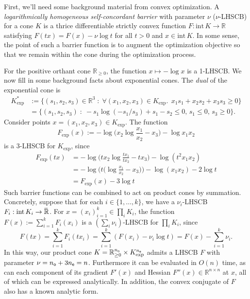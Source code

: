 \begin{subappendices}
\begin{lproof}
    First, we'll need some background material from convex optimization.
    A \emph{logarithmically homogeneous self-concordant barrier} with parameter $\nu$ ($\nu$-LHSCB) for a cone $K$ is a thrice differentiable strictly convex function $F: \mathrm{int}\, K \to \mathbb R$ satisfying
    $F(tx) = F(x) - \nu \log t$
    for all $t > 0$ and $x \in \mathrm{int}\, K$.
    In some sense, the point of such a barrier function is to augment the optimization objective so that we remain within the cone during the optimization process.


    For the positive orthant cone $\mathbb R_{\ge 0}$, the function
        $x \mapsto - \log x$ is a 1-LHSCB.
    We now fill in some background facts about exponential cones.
    The \emph{dual} of the exponential cone is
    \begin{align*}
        K_{\exp}^* &:= \big\{ (s_1, s_2, s_3) \in \mathbb R^3 \;:\;
            \forall (x_1, x_2, x_3) \in K_{\exp}.~~
            x_1 s_1 + x_2 s_2 + x_3 s_3 \ge 0   \big\}\\
            &= \big\{
                (s_1, s_2, s_3) \;:\; - s_1 \log (- s_1 / s_3) + s_1 - s_2 \le 0,
                    \, s_1 \le 0,\,  s_3 \ge 0
            \big\}.
    \end{align*}
    Consider points $x = (x_1, x_2, x_3) \in K_{\exp}$.
    The function
    \begin{equation}
        F_{\exp}(x) := - \log \Big(x_2 \log\frac{x_1}{x_2} - x_3\Big) - \log x_1 x_2
    \end{equation}
    is a $3$-LHSCB for $K_{\exp}$, since
    \begin{align*}
        F_{\exp}(t x) &=
            -\log \Big( t x_2 \log \frac{t x_1}{t x_2} - t x_3\Big) - \log(t^2 x_1 x_2) \\
        &= - \log \Big(t \big(\log \frac{x_1}{x_2} - x_3\big)\Big) - \log(x_1 x_2) - 2 \log t \\
        &= F_{\exp}(x) - 3 \log t
    \end{align*}
    Such barrier functions can be combined to act on product cones by summation.
    Concretely, suppose that for each $i \in \{1, \ldots, k\}$,
    we have a $\nu_i$-LHSCB $F_i: \mathrm{int}\, K_i \to \mskip1mu\overline{\mskip-1mu\mathbb R\!}\,$.
    For $x = (x_i)_{i=1}^k \in \prod_i K_i$, the function
    $F(x) := \sum_{i=1}^k F_i(x_i)$ is a $(\sum_i \nu_i)$-LHSCB for $\prod_i K_i$,
    since
    \[
        F(tx) = \sum_{i=1}^k F_i(t x_i)
            = \sum_{i=1}^k ( F(x_i) - \nu_i \log t)
            = F(x) - \sum_{i=1}^k \nu_i.
    \]
    In this way, our product cone $K = \mathbb R_{\ge 0}^{n_{\sf o}} \times K^{n_{\sf e}}_{\exp}$ admits a LHSCB $F$ with parameter $\nu = n_{\sf o} + 3 n_{\sf e} = n$.
    Furthermore it can be evaluated in $O(n)$ time, as can each component of
    its gradient $F'(x)$ and Hessian $F''(x) \in \mathbb R^{n \times n}$ at $x$, all of which can be expressed analytically.
    In addition, the convex conjugate of $F$
    also has a known analytic form.



\end{lproof}
\end{subappendices}
